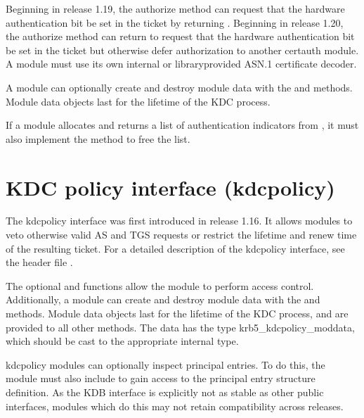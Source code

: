 \documentclass[letterpaper,10pt,english]{sphinxmanual}
\begin{document}
\sphinxAtStartPar
Beginning in release 1.19, the authorize method can request that the
hardware authentication bit be set in the ticket by returning
.  Beginning in release 1.20, the authorize
method can return  to request that the
hardware authentication bit be set in the ticket but otherwise defer
authorization to another certauth module.  A module must use its own
internal or library\sphinxhyphen{}provided ASN.1 certificate decoder.

\sphinxAtStartPar
A module can optionally create and destroy module data with the
 and  methods.  Module data objects last for the
lifetime of the KDC process.

\sphinxAtStartPar
If a module allocates and returns a list of authentication indicators
from , it must also implement the  method
to free the list.

\sphinxstepscope


\section{KDC policy interface (kdcpolicy)}
\label{\detokenize{plugindev/kdcpolicy:kdc-policy-interface-kdcpolicy}}\label{\detokenize{plugindev/kdcpolicy:kdcpolicy-plugin}}\label{\detokenize{plugindev/kdcpolicy::doc}}
\sphinxAtStartPar
The kdcpolicy interface was first introduced in release 1.16.  It
allows modules to veto otherwise valid AS and TGS requests or restrict
the lifetime and renew time of the resulting ticket.  For a detailed
description of the kdcpolicy interface, see the header file
.

\sphinxAtStartPar
The optional  and  functions allow the module
to perform access control.  Additionally, a module can create and
destroy module data with the  and  methods.  Module
data objects last for the lifetime of the KDC process, and are
provided to all other methods.  The data has the type
krb5\_kdcpolicy\_moddata, which should be cast to the appropriate
internal type.

\sphinxAtStartPar
kdcpolicy modules can optionally inspect principal entries.  To do
this, the module must also include  to gain access to the
principal entry structure definition.  As the KDB interface is
explicitly not as stable as other public interfaces, modules which do
this may not retain compatibility across releases.



\renewcommand{\indexname}{Index}
\printindex
\end{document}
